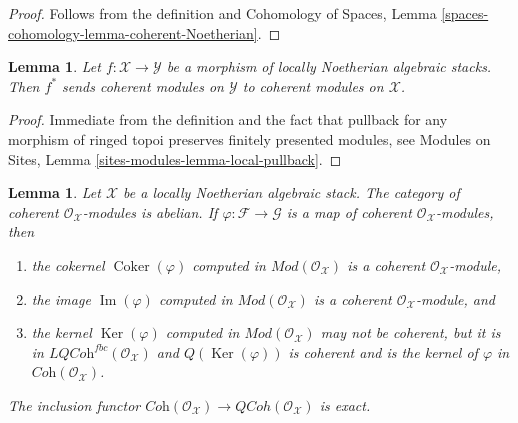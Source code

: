 \documentclass{stacks-project}
\theoremstyle{plain}
\newtheorem{lemma}[subsection]{Lemma}
\theoremstyle{definition}
\theoremstyle{remark}
\numberwithin{equation}{subsection}
\def\QCoh{\mathit{QCoh}}
\def\Ker{\mathop{\mathrm{Ker}}}
\def\Im{\mathop{\mathrm{Im}}}
\def\Coker{\mathop{\mathrm{Coker}}}
\begin{document}
\begin{proof}
Follows from the definition and
Cohomology of Spaces, Lemma
\ref{spaces-cohomology-lemma-coherent-Noetherian}.
\end{proof}

\begin{lemma}
\label{lemma-pullback-coherent}
Let $f : \mathcal{X} \to \mathcal{Y}$ be a morphism of locally
Noetherian algebraic stacks. Then $f^*$ sends coherent modules
on $\mathcal{Y}$ to coherent modules on $\mathcal{X}$.
\end{lemma}

\begin{proof}
Immediate from the definition and the fact that pullback for any morphism
of ringed topoi preserves finitely presented modules, see
Modules on Sites, Lemma \ref{sites-modules-lemma-local-pullback}.
\end{proof}

\begin{lemma}
\label{lemma-coherent-abelian-Noetherian}
Let $\mathcal{X}$ be a locally Noetherian algebraic stack.
The category of coherent $\mathcal{O}_\mathcal{X}$-modules is abelian.
If $\varphi : \mathcal{F} \to \mathcal{G}$ is a map
of coherent $\mathcal{O}_\mathcal{X}$-modules, then
\begin{enumerate}
\item the cokernel $\Coker(\varphi)$ computed in
$\textit{Mod}(\mathcal{O}_\mathcal{X})$ is a coherent
$\mathcal{O}_\mathcal{X}$-module,
\item the image $\Im(\varphi)$ computed in
$\textit{Mod}(\mathcal{O}_\mathcal{X})$ is a coherent
$\mathcal{O}_\mathcal{X}$-module, and
\item the kernel $\Ker(\varphi)$ computed in
$\textit{Mod}(\mathcal{O}_\mathcal{X})$
may not be coherent, but it is
in $\textit{LQCoh}^{fbc}(\mathcal{O}_\mathcal{X})$ and $Q(\Ker(\varphi))$
is coherent and is the kernel of $\varphi$ in
$\textit{Coh}(\mathcal{O}_\mathcal{X})$.
\end{enumerate}
The inclusion functor $\textit{Coh}(\mathcal{O}_\mathcal{X}) \to
\QCoh(\mathcal{O}_\mathcal{X})$ is exact.
\end{lemma}
\end{document}
